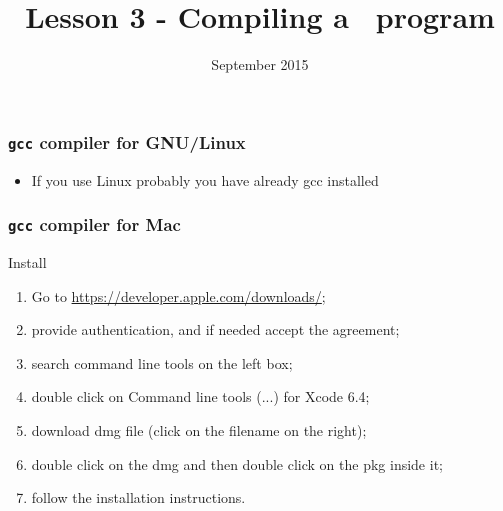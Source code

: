 


\title[Lesson 3]{\textbf{Lesson 3 - Compiling a \C\ program}}
\date[14/9/15]{ September 2015}



\begin{frame}[plain]
  \titlepage
\end{frame}

\begin{frame}
  \frametitle{\texttt{gcc} compiler for GNU/Linux}
  \begin{itemize}
  \item If you use Linux probably you have already gcc installed 
  \end{itemize}
\end{frame}

\begin{frame}
  \frametitle{\texttt{gcc} compiler for Mac}
  \begin{block}{Install}
    \begin{enumerate}
    \item Go to \url{https://developer.apple.com/downloads/};
    \item provide authentication, and if needed accept the agreement;
    \item search \alert{command line tools} on the left box;
    \item double click on \alert{Command line tools (...) for Xcode
        6.4};
    \item download \alert{dmg} file (click on the filename on the right);
    \item double click on the \alert{dmg} and then double
      click on the \alert{pkg} inside it;
    \item follow the installation instructions.
    \end{enumerate}
  \end{block}
\end{frame}

